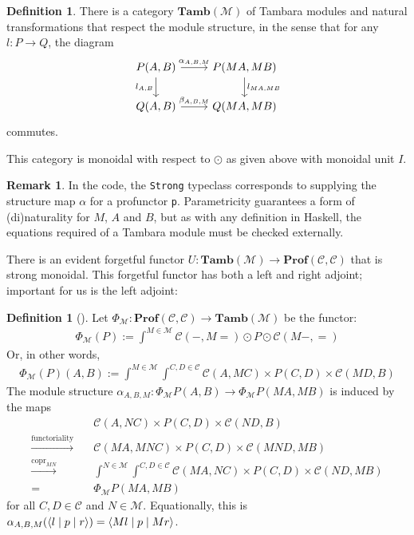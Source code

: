 \documentclass[11pt,a4paper]{article}
\theoremstyle{plain}
\theoremstyle{definition}
\newtheorem{definition}[theorem]{Definition}
\newtheorem{remark}[theorem]{Remark}
\newcommand{\C}{\mathscr{C}}
\newcommand{\M}{\mathscr{M}}
\newcommand{\Pastro}{\Phi}
\newcommand{\Prof}{\mathbf{Prof}}
\newcommand{\Tamb}{\mathbf{Tamb}}
\DeclareMathOperator{\copr}{copr}
\newcommand{\repthree}[3]{{\ensuremath \langle #1 \mid #2 \mid #3 \rangle}}
\begin{document}
\begin{definition}
  There is a category $\Tamb(\M)$ of Tambara modules and natural transformations that respect the module structure, in the sense that for any $l : P \to Q$, the diagram
  \[
    \begin{tikzcd}
      P(A,B) \ar[r, "\alpha_{A,B,M}"] \ar[d, "l_{A,B}" left] & P(MA, MB) \ar[d, "l_{MA, MB}" right] \\
      Q(A,B) \ar[r, "\beta_{A,B,M}"] & Q(MA, MB)
    \end{tikzcd}
  \]
  commutes.
\end{definition}

This category is monoidal with respect to $\odot$ as given above with monoidal unit $I$.

\begin{remark}
  In the code, the \texttt{Strong} typeclass corresponds to supplying the structure map $\alpha$ for a profunctor \texttt{p}. Parametricity guarantees a form of (di)naturality for $M$, $A$ and $B$, but as with any definition in Haskell, the equations required of a Tambara module must be checked externally.
\end{remark}

There is an evident forgetful functor $U : \Tamb(\M) \to \Prof(\C, \C)$ that is strong monoidal. This forgetful functor has both a left and right adjoint; important for us is the left adjoint:

\begin{definition}[{\cite[Section 5]{Doubles}}]
  Let $\Pastro_\M : \Prof(\C, \C) \to \Tamb(\M)$ be the functor:
  \begin{align*}
    \Pastro_\M(P) := \int^{M \in \M}  \C(-, M{=}) \odot P \odot \C(M-, {=})
  \end{align*}
  Or, in other words,
  \begin{align*}
    \Pastro_\M(P)(A,B) := \int^{M \in \M} \int^{C,D \in \C} \C(A, MC) \times P(C,D) \times  \C(MD, B)
  \end{align*}
  The module structure $\alpha_{A,B,M} : \Pastro_\M P(A,B) \to \Pastro_\M P (MA, MB)
  $ is induced by the maps
  \begin{align*}
    &\C(A, NC) \times P(C,D) \times  \C(ND, B) \\
    \xrightarrow{\text{functoriality}} \quad& \C(MA, MNC) \times P(C,D) \times  \C(MND, MB) \\
    \xrightarrow{\copr_{MN}} \quad&\int^{N \in \M} \int^{C,D \in \C} \C(MA, NC) \times P(C,D) \times  \C(ND, MB) \\
    = \quad&\Pastro_\M P (MA, MB)
  \end{align*}
  for all $C, D \in \C$ and $N \in \M$. Equationally, this is $\alpha_{A,B,M}(\repthree{l}{p}{r} ) = \repthree{Ml}{p}{Mr} $.
\end{definition}
\end{document}
